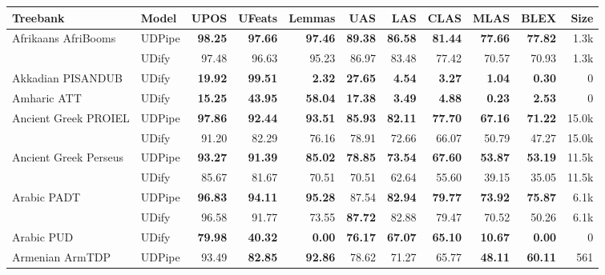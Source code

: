 \documentclass[11pt,a4paper]{article}
\begin{document}
\begin{table*}
    \fontsize{8}{10}\selectfont
    \begin{center}
    \begin{tabular}{@{}llrrrrrrrrr@{}}
    \toprule
    \sc Treebank & \sc Model & \sc UPOS & \sc UFeats & \sc Lemmas & \sc UAS & \sc LAS & \sc CLAS & \sc  MLAS & \sc BLEX & \sc Size \\
    \midrule
    Afrikaans AfriBooms & UDPipe &  \bf 98.25 &  \bf 97.66 &   \bf 97.46 &  \bf 89.38 &  \bf 86.58 &  \bf 81.44 &  \bf 77.66 &  \bf 77.82 &   1.3k \\
               & UDify &      97.48 &      96.63 &       95.23 &      86.97 &      83.48 &      77.42 &      70.57 &      70.93 &   1.3k \\
    \addlinespace
    Akkadian PISANDUB & UDify &  \bf 19.92 &  \bf 99.51 &    \bf 2.32 &  \bf 27.65 &   \bf 4.54 &   \bf 3.27 &   \bf 1.04 &   \bf 0.30 &      0 \\
    \addlinespace
    Amharic ATT & UDify &  \bf 15.25 &  \bf 43.95 &   \bf 58.04 &  \bf 17.38 &   \bf 3.49 &   \bf 4.88 &   \bf 0.23 &   \bf 2.53 &      0 \\
    \addlinespace
    Ancient Greek PROIEL & UDPipe &  \bf 97.86 &  \bf 92.44 &   \bf 93.51 &  \bf 85.93 &  \bf 82.11 &  \bf 77.70 &  \bf 67.16 &  \bf 71.22 &  15.0k \\
               & UDify &      91.20 &      82.29 &       76.16 &      78.91 &      72.66 &      66.07 &      50.79 &      47.27 &  15.0k \\
    \addlinespace
    Ancient Greek Perseus & UDPipe &  \bf 93.27 &  \bf 91.39 &   \bf 85.02 &  \bf 78.85 &  \bf 73.54 &  \bf 67.60 &  \bf 53.87 &  \bf 53.19 &  11.5k \\
               & UDify &      85.67 &      81.67 &       70.51 &      70.51 &      62.64 &      55.60 &      39.15 &      35.05 &  11.5k \\
    \addlinespace
    Arabic PADT & UDPipe &  \bf 96.83 &  \bf 94.11 &   \bf 95.28 &      87.54 &  \bf 82.94 &  \bf 79.77 &  \bf 73.92 &  \bf 75.87 &   6.1k \\
               & UDify &      96.58 &      91.77 &       73.55 &  \bf 87.72 &      82.88 &      79.47 &      70.52 &      50.26 &   6.1k \\
    \addlinespace
    Arabic PUD & UDify &  \bf 79.98 &  \bf 40.32 &    \bf 0.00 &  \bf 76.17 &  \bf 67.07 &  \bf 65.10 &  \bf 10.67 &   \bf 0.00 &      0 \\
    \addlinespace
    Armenian ArmTDP & UDPipe &      93.49 &  \bf 82.85 &   \bf 92.86 &      78.62 &      71.27 &      65.77 &  \bf 48.11 &  \bf 60.11 &    561 \\

\end{tabular}
\end{center}
\end{table*}
\end{document}
